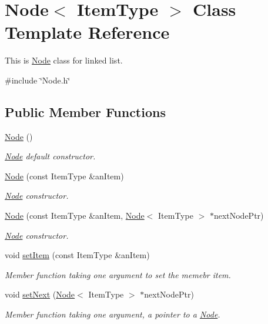 \hypertarget{classNode}{}\section{Node$<$ Item\+Type $>$ Class Template Reference}
\label{classNode}


This is \hyperlink{classNode}{Node} class for linked list.  




{\ttfamily \#include \char`\"{}Node.\+h\char`\"{}}

\subsection*{Public Member Functions}
\begin{DoxyCompactItemize}
\item 
\hyperlink{classNode_a627e94f4fba0e73c546e0fb2a7266f36}{Node} ()
\begin{DoxyCompactList}\small\item\em \hyperlink{classNode}{Node} default constructor. \end{DoxyCompactList}\item 
\hyperlink{classNode_a0288598fcb0244739ce95099c26250ae}{Node} (const Item\+Type \&an\+Item)
\begin{DoxyCompactList}\small\item\em \hyperlink{classNode}{Node} constructor. \end{DoxyCompactList}\item 
\hyperlink{classNode_adf98d3f9b7227622cb5a0fdd7e8f0b18}{Node} (const Item\+Type \&an\+Item, \hyperlink{classNode}{Node}$<$ Item\+Type $>$ $\ast$next\+Node\+Ptr)
\begin{DoxyCompactList}\small\item\em \hyperlink{classNode}{Node} constructor. \end{DoxyCompactList}\item 
void \hyperlink{classNode_ab4ceecdecc5df799011de486b9f54974}{set\+Item} (const Item\+Type \&an\+Item)
\begin{DoxyCompactList}\small\item\em Member function taking one argument to set the memebr item. \end{DoxyCompactList}\item 
void \hyperlink{classNode_a01c1a66d4e39f5b149e090413deb4633}{set\+Next} (\hyperlink{classNode}{Node}$<$ Item\+Type $>$ $\ast$next\+Node\+Ptr)
\begin{DoxyCompactList}\small\item\em Member function taking one argument, a pointer to a \hyperlink{classNode}{Node}. \end{DoxyCompactList}\item 

\end{DoxyCompactItemize}
